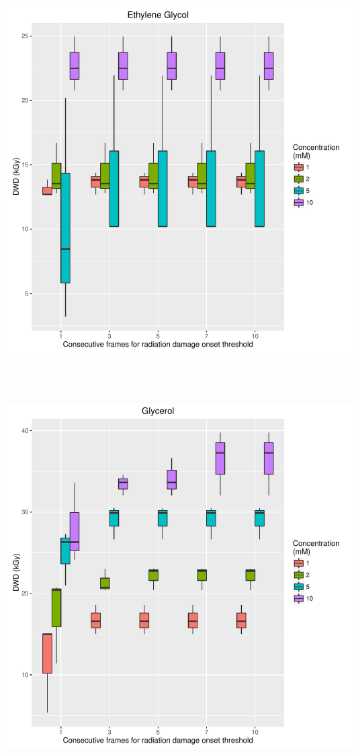 \begin{figure}
    \ContinuedFloat
    \centering
    \begin{subfigure}[b]{0.75\textwidth}
            \centering
            \includegraphics[width=\textwidth]{figures/saxs/Ethylene_Glycol_Num_consec_fr_comp.pdf}
            \caption{}
            \label{}
    \end{subfigure}
    \\
    \begin{subfigure}[b]{0.75\textwidth}
            \centering
            \includegraphics[width=\textwidth]{figures/saxs/Glycerol_Num_consec_fr_comp.pdf}
            \caption{}
            \label{}
    \end{subfigure}
\end{figure}
